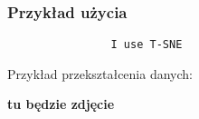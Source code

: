 			
		\subsubsection{Przykład użycia}
			\begin{verbatim}
				I use T-SNE
			\end{verbatim}
			
			
			Przykład przekształcenia danych:
			
				\textbf{tu będzie zdjęcie}
	
	






